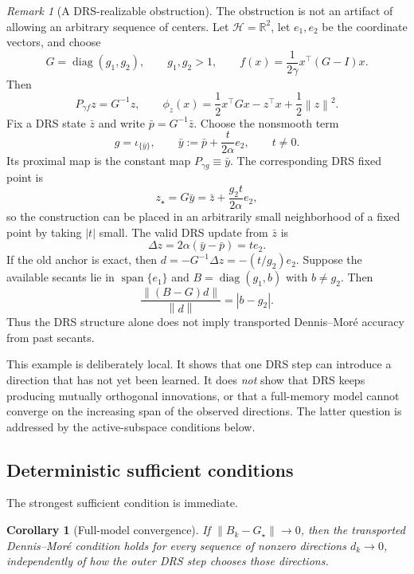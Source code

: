 \documentclass[10pt,leqno]{amsart}
\numberwithin{equation}{section}
\numberwithin{algorithm}{section}
\newtheorem{corollary}[theorem]{Corollary}
\theoremstyle{remark}
\newtheorem{remark}[theorem]{Remark}
\newcommand{\Hcal}{\mathcal{H}}
\newcommand{\R}{\mathbb{R}}
\DeclareMathOperator{\diag}{diag}
\newcommand{\norm}[1]{\left\lVert #1 \right\rVert}
\begin{document}
\begin{remark}[A DRS-realizable obstruction]
\label{rem:dm-orthogonal-counterexample}
The obstruction is not an artifact of allowing an arbitrary sequence of centers.  Let $\Hcal=\R^2$, let $e_1,e_2$ be the coordinate vectors, and choose
\[
    G=\diag(g_1,g_2),
    \qquad g_1,g_2>1,
    \qquad
    f(x)=\frac{1}{2\gamma}x^\top(G-I)x.
\]
Then
\[
    P_{\gamma f}z=G^{-1}z,
    \qquad
    \phi_z(x)=\frac12x^\top Gx-z^\top x+\frac12\norm z^2.
\]
Fix a DRS state $\bar z$ and write $\bar p=G^{-1}\bar z$.  Choose the nonsmooth term
\[
    g=\iota_{\{\bar y\}},
    \qquad
    \bar y:=\bar p+\frac{t}{2\alpha}e_2,
    \qquad t\ne0.
\]
Its proximal map is the constant map $P_{\gamma g}\equiv\bar y$.  The corresponding DRS fixed point is
\[
    z_\star=G\bar y
      =\bar z+\frac{g_2t}{2\alpha}e_2,
\]
so the construction can be placed in an arbitrarily small neighborhood of a fixed point by taking $|t|$ small.  The valid DRS update from $\bar z$ is
\[
    \Delta z=2\alpha(\bar y-\bar p)=t e_2.
\]
If the old anchor is exact, then $d=-G^{-1}\Delta z=-(t/g_2)e_2$.  Suppose the available secants lie in $\operatorname{span}\{e_1\}$ and
$B=\diag(g_1,b)$ with $b\ne g_2$.  Then
\[
    \frac{\norm{(B-G)d}}{\norm d}=|b-g_2|.
\]
Thus the DRS structure alone does not imply transported Dennis--Mor\'e accuracy from past secants.

This example is deliberately local.  It shows that one DRS step can introduce a direction that has not yet been learned.  It does \emph{not} show that DRS keeps producing mutually orthogonal innovations, or that a full-memory model cannot converge on the increasing span of the observed directions.  The latter question is addressed by the active-subspace conditions below.
\end{remark}

\subsection{Deterministic sufficient conditions}

The strongest sufficient condition is immediate.

\begin{corollary}[Full-model convergence]
\label{cor:dm-full-model-convergence}
If $\norm{B_k-G_\star}\to0$, then the transported Dennis--Mor\'e condition holds for every sequence of nonzero directions $d_k\to0$, independently of how the outer DRS step chooses those directions.
\end{corollary}
\end{document}
